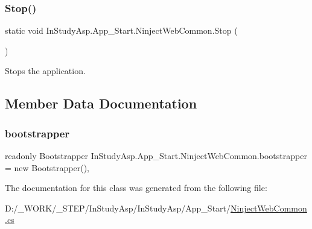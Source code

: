 \subsubsection{\texorpdfstring{Stop()}{Stop()}}
{\footnotesize\ttfamily static void In\+Study\+Asp.\+App\+\_\+\+Start.\+Ninject\+Web\+Common.\+Stop (\begin{DoxyParamCaption}{ }\end{DoxyParamCaption})\hspace{0.3cm}{\ttfamily [static]}}



Stops the application. 



\subsection{Member Data Documentation}
\mbox{\label{class_in_study_asp_1_1_app___start_1_1_ninject_web_common_ae16416703e3d7ba27646e2d8c317244b}} 
\subsubsection{\texorpdfstring{bootstrapper}{bootstrapper}}
{\footnotesize\ttfamily readonly Bootstrapper In\+Study\+Asp.\+App\+\_\+\+Start.\+Ninject\+Web\+Common.\+bootstrapper = new Bootstrapper()\hspace{0.3cm}{\ttfamily [static]}, {\ttfamily [private]}}



The documentation for this class was generated from the following file\+:\begin{DoxyCompactItemize}
\item 
D\+:/\+\_\+\+W\+O\+R\+K/\+\_\+\+S\+T\+E\+P/\+In\+Study\+Asp/\+In\+Study\+Asp/\+App\+\_\+\+Start/\hyperlink{_ninject_web_common_8cs}{Ninject\+Web\+Common.\+cs}\end{DoxyCompactItemize}
